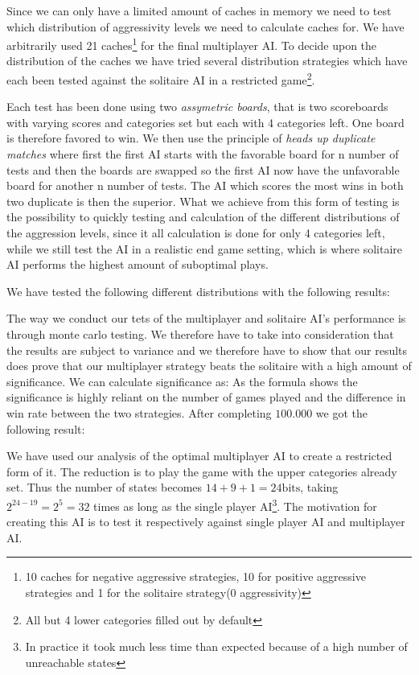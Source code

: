Since we can only have a limited amount of caches in memory we need to test which distribution of aggressivity levels we need to calculate caches for. We have arbitrarily used 21 caches\footnote{10 caches for negative aggressive strategies, 10 for positive aggressive strategies and 1 for the solitaire strategy(0 aggressivity)} for the final multiplayer AI. To decide upon the distribution of the caches we have tried several distribution strategies which have each been tested against the solitaire AI in a restricted game\footnote{All but 4 lower categories filled out by default}. 

Each test has been done using two \emph{assymetric boards}, that is two scoreboards with varying scores and categories set but each with 4 categories left. One board is therefore favored to win. We then use the principle of \emph{heads up duplicate matches} where first the first AI starts with the favorable board for n number of tests and then the boards are swapped so the first AI now have the unfavorable board for another n number of tests. The AI which scores the most wins in both two duplicate is then the superior. What we achieve from this form of testing is the possibility to quickly testing and calculation of the different distributions of the aggression levels, since it all calculation is done for only 4 categories left, while we still test the AI in a realistic end game setting, which is where solitaire AI performs the highest amount of suboptimal plays\citep{pawlewicz2011nearly}.

We have tested the following different distributions with the following results: %

The way we conduct our tets of the multiplayer and solitaire AI's performance is through monte carlo testing. We therefore have to take into consideration that the results are subject to variance and we therefore have to show that our results does prove that our multiplayer strategy beats the solitaire with a high amount of significance. We can calculate significance as: %
As the formula shows the significance is highly reliant on the number of games played and the difference in win rate between the two strategies. After completing $100.000$ we got the following result: %


We have used our analysis of the optimal multiplayer AI to create a restricted form of it. The reduction is to play the game with the upper categories already set. Thus the number of states becomes $14+9+1 = 24\mbox{bits}$, taking $2^{24-19} = 2^5 = 32$ times as long as the single player AI\footnote{In practice it took much less time than expected because of a high number of unreachable states}. The motivation for creating this AI is to test it respectively against single player AI and multiplayer AI. %